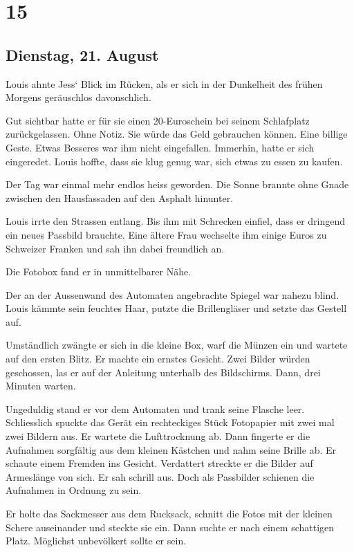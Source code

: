 \chapter{15}\label{section-14}

\section{Dienstag, 21. August}\label{dienstag-21.-august}

Louis ahnte Jess` Blick im Rücken, als er sich in der Dunkelheit des
frühen Morgens geräuschlos davonschlich.

Gut sichtbar hatte er für sie einen 20-Euroschein bei seinem Schlafplatz
zurückgelassen. Ohne Notiz. Sie würde das Geld gebrauchen können. Eine
billige Geste. Etwas Besseres war ihm nicht eingefallen. Immerhin, hatte
er sich eingeredet. Louis hoffte, dass sie klug genug war, sich etwas zu
essen zu kaufen.

Der Tag war einmal mehr endlos heiss geworden. Die Sonne brannte ohne
Gnade zwischen den Hausfassaden auf den Asphalt hinunter.

Louis irrte den Strassen entlang. Bis ihm mit Schrecken einfiel, dass er
dringend ein neues Passbild brauchte. Eine ältere Frau wechselte ihm
einige Euros zu Schweizer Franken und sah ihn dabei freundlich an.

Die Fotobox fand er in unmittelbarer Nähe.

Der an der Aussenwand des Automaten angebrachte Spiegel war nahezu
blind. Louis kämmte sein feuchtes Haar, putzte die Brillengläser und
setzte das Gestell auf.

Umständlich zwängte er sich in die kleine Box, warf die Münzen ein und
wartete auf den ersten Blitz. Er machte ein ernstes Gesicht. Zwei Bilder
würden geschossen, las er auf der Anleitung unterhalb des Bildschirms.
Dann, drei Minuten warten.

Ungeduldig stand er vor dem Automaten und trank seine Flasche leer.
Schliesslich spuckte das Gerät ein rechteckiges Stück Fotopapier mit
zwei mal zwei Bildern aus. Er wartete die Lufttrocknung ab. Dann
fingerte er die Aufnahmen sorgfältig aus dem kleinen Kästchen und nahm
seine Brille ab. Er schaute einem Fremden ins Gesicht. Verdattert
streckte er die Bilder auf Armeslänge von sich. Er sah schrill aus. Doch
als Passbilder schienen die Aufnahmen in Ordnung zu sein.

Er holte das Sackmesser aus dem Rucksack, schnitt die Fotos mit der
kleinen Schere auseinander und steckte sie ein. Dann suchte er nach
einem schattigen Platz. Möglichst unbevölkert sollte er sein.

